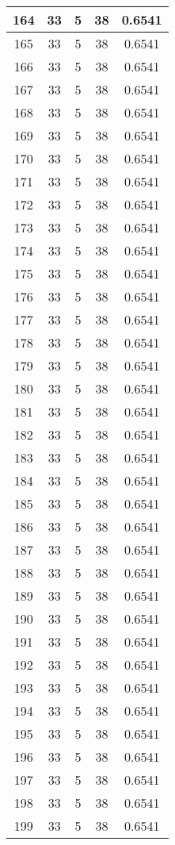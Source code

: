 \documentclass[letterpaper, 12pt]{article}
\begin{document}
\begin{longtable}{|c|c|c|c|c|}
\hline
164 & 33 & 5 & 38 & 0.6541 \\
\hline
165 & 33 & 5 & 38 & 0.6541 \\
\hline
166 & 33 & 5 & 38 & 0.6541 \\
\hline
167 & 33 & 5 & 38 & 0.6541 \\
\hline
168 & 33 & 5 & 38 & 0.6541 \\
\hline
169 & 33 & 5 & 38 & 0.6541 \\
\hline
170 & 33 & 5 & 38 & 0.6541 \\
\hline
171 & 33 & 5 & 38 & 0.6541 \\
\hline
172 & 33 & 5 & 38 & 0.6541 \\
\hline
173 & 33 & 5 & 38 & 0.6541 \\
\hline
174 & 33 & 5 & 38 & 0.6541 \\
\hline
175 & 33 & 5 & 38 & 0.6541 \\
\hline
176 & 33 & 5 & 38 & 0.6541 \\
\hline
177 & 33 & 5 & 38 & 0.6541 \\
\hline
178 & 33 & 5 & 38 & 0.6541 \\
\hline
179 & 33 & 5 & 38 & 0.6541 \\
\hline
180 & 33 & 5 & 38 & 0.6541 \\
\hline
181 & 33 & 5 & 38 & 0.6541 \\
\hline
182 & 33 & 5 & 38 & 0.6541 \\
\hline
183 & 33 & 5 & 38 & 0.6541 \\
\hline
184 & 33 & 5 & 38 & 0.6541 \\
\hline
185 & 33 & 5 & 38 & 0.6541 \\
\hline
186 & 33 & 5 & 38 & 0.6541 \\
\hline
187 & 33 & 5 & 38 & 0.6541 \\
\hline
188 & 33 & 5 & 38 & 0.6541 \\
\hline
189 & 33 & 5 & 38 & 0.6541 \\
\hline
190 & 33 & 5 & 38 & 0.6541 \\
\hline
191 & 33 & 5 & 38 & 0.6541 \\
\hline
192 & 33 & 5 & 38 & 0.6541 \\
\hline
193 & 33 & 5 & 38 & 0.6541 \\
\hline
194 & 33 & 5 & 38 & 0.6541 \\
\hline
195 & 33 & 5 & 38 & 0.6541 \\
\hline
196 & 33 & 5 & 38 & 0.6541 \\
\hline
197 & 33 & 5 & 38 & 0.6541 \\
\hline
198 & 33 & 5 & 38 & 0.6541 \\
\hline
199 & 33 & 5 & 38 & 0.6541 \\
\hline
\end{longtable}
\end{document}
